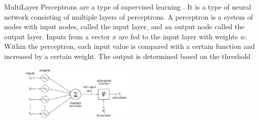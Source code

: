 \hspace{0.5cm} MultiLayer Perceptrons are a type of supervised learning \cite{michie1994machine}. It is a type of neural network consisting of multiple layers of perceptrons. A perceptron is a system of nodes with input nodes, called the input layer, and an output node called the output layer. Inputs from a vector $x$ are fed to the input layer with weights $w$. Within the perceptron, each input value is compared with a certain function and increased by a certain weight. The output is determined based on the threshold
\begin{figure}[h]
    \includegraphics[width=55mm]{./img/perceptron.png}
\end{figure}